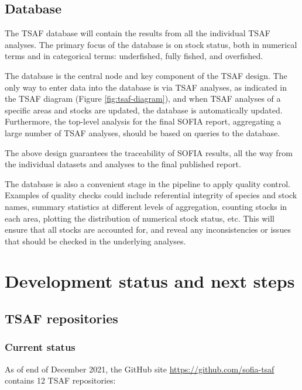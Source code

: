 \documentclass[12pt]{article}
\newcommand\blue[1]{\textcolor{darkblue}{#1}}
\begin{document}
\subsection{Database}

The TSAF database will contain the results from all the individual TSAF
analyses. The primary focus of the database is on stock status, both in
numerical terms and in categorical terms: underfished, fully fished, and
overfished.

The database is the central node and key component of the TSAF design. The only
way to enter data into the database is via TSAF analyses, as indicated in the
TSAF diagram (Figure \ref{fig:tsaf-diagram}), and when TSAF analyses of a
specific areas and stocks are updated, the database is automatically updated.
Furthermore, the top-level analysis for the final SOFIA report, aggregating a
large number of TSAF analyses, should be based on queries to the database.

The above design guarantees the traceability of SOFIA results, all the way from
the individual datasets and analyses to the final published report.

The database is also a convenient stage in the pipeline to apply quality
control. Examples of quality checks could include referential integrity of
species and stock names, summary statistics at different levels of aggregation,
counting stocks in each area, plotting the distribution of numerical stock
status, etc. This will ensure that all stocks are accounted for, and reveal any
inconsistencies or issues that should be checked in the underlying analyses.


\section{Development status and next steps}

\subsection{TSAF repositories}

\subsubsection{Current status}

As of end of December 2021, the GitHub site
\blue{\url{https://github.com/sofia-tsaf}} contains 12 TSAF repositories:
\end{document}
